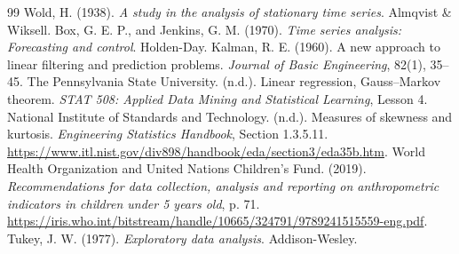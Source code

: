 \documentclass[12pt,a4paper]{article}
\numberwithin{equation}{section}
\numberwithin{table}{section}
\numberwithin{figure}{section}
\begin{document}
\begin{thebibliography}{99}
 Wold, H. (1938). \emph{A study in the analysis of stationary time series}. Almqvist \& Wiksell.
 Box, G. E. P., and Jenkins, G. M. (1970). \emph{Time series analysis: Forecasting and control}. Holden-Day.
 Kalman, R. E. (1960). A new approach to linear filtering and prediction problems. \emph{Journal of Basic Engineering}, 82(1), 35--45.
 The Pennsylvania State University. (n.d.). Linear regression, Gauss--Markov theorem. \emph{STAT 508: Applied Data Mining and Statistical Learning}, Lesson 4.
 National Institute of Standards and Technology. (n.d.). Measures of skewness and kurtosis. \emph{Engineering Statistics Handbook}, Section 1.3.5.11. \url{https://www.itl.nist.gov/div898/handbook/eda/section3/eda35b.htm}.
 World Health Organization and United Nations Children's Fund. (2019). \emph{Recommendations for data collection, analysis and reporting on anthropometric indicators in children under 5 years old}, p. 71. \url{https://iris.who.int/bitstream/handle/10665/324791/9789241515559-eng.pdf}.
 Tukey, J. W. (1977). \emph{Exploratory data analysis}. Addison-Wesley.


\end{thebibliography}
\end{document}
